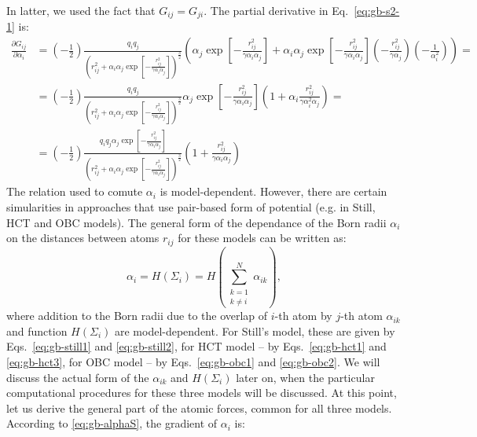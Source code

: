 \documentclass[11pt]{book}
\begin{document}
In latter, we used the fact that $G_{ij}=G_{ji}$. The partial derivative in Eq.~\ref{eq:gb-s2-1} is:
\begin{equation}\label{eq:gb-partGilalphai}
\begin{split}
\frac{\partial G_{ij}}{\partial \alpha_{i}}&=\left(-\frac{1}{2}\right)\frac{q_{i}q_{j}}{\left(r_{ij}^{2}+\alpha_{i}\alpha_{j}\exp{\left[-\frac{r_{ij}^{2}}{\gamma\alpha_{i}\alpha_{j}}\right]}\right)^{\frac{3}{2}}}\left(\alpha_{j}\exp{\left[-\frac{r_{ij}^{2}}{\gamma\alpha_{i}\alpha_{j}}\right]}+\alpha_{i}\alpha_{j}\exp{\left[-\frac{r_{ij}^{2}}{\gamma\alpha_{i}\alpha_{j}}\right]}\left(-\frac{r_{ij}^{2}}{\gamma\alpha_{j}}\right)\left(-\frac{1}{\alpha_{i}^{2}}\right)\right)=\\
&=\left(-\frac{1}{2}\right)\frac{q_{i}q_{j}}{\left(r_{ij}^{2}+\alpha_{i}\alpha_{j}\exp{\left[-\frac{r_{ij}^{2}}{\gamma\alpha_{i}\alpha_{j}}\right]}\right)^{\frac{3}{2}}}\alpha_{j}\exp{\left[-\frac{r_{ij}^{2}}{\gamma\alpha_{i}\alpha_{j}}\right]}\left(1+\alpha_{i}\frac{r_{ij}^{2}}{\gamma\alpha_{i}^{2}\alpha_{j}}\right)=\\
&=\left(-\frac{1}{2}\right)\frac{q_{i}q_{j}\alpha_{j}\exp{\left[-\frac{r_{ij}^{2}}{\gamma\alpha_{i}\alpha_{j}}\right]}}{\left(r_{ij}^{2}+\alpha_{i}\alpha_{j}\exp{\left[-\frac{r_{ij}^{2}}{\gamma\alpha_{i}\alpha_{j}}\right]}\right)^{\frac{3}{2}}}\left(1+\frac{r_{ij}^{2}}{\gamma\alpha_{i}\alpha_{j}}\right)
\end{split}
\end{equation}
The relation used to comute $\alpha_{i}$ is model-dependent. However, there are certain simularities in approaches that use pair-based form of potential (e.g. in Still, HCT and OBC models). The general form of the dependance of the Born radii $\alpha_{i}$ on the distances between atoms $r_{ij}$ for these models can be written as:
\begin{equation}\label{eq:gb-alphaS}
\alpha_{i}=H(\Sigma_{i})=H(\sum_{\substack{k=1\\k\ne i}}^{N}\alpha_{ik}),
\end{equation}
where addition to the Born radii due to the overlap of $i$-th atom by $j$-th atom $\alpha_{ik}$ and function $H(\Sigma_{i})$ are model-dependent. For Still's model, these are given by Eqs.~\ref{eq:gb-still1} and \ref{eq:gb-still2}, for HCT model -- by Eqs.~\ref{eq:gb-hct1} and \ref{eq:gb-hct3}, for OBC model -- by Eqs.~\ref{eq:gb-obc1} and \ref{eq:gb-obc2}. We will discuss the actual form of the $\alpha_{ik}$ and $H(\Sigma_{i})$ later on, when the particular computational procedures for these three models will be discussed. At this point, let us derive the general part of the atomic forces, common for all three models. According to \ref{eq:gb-alphaS}, the gradient of $\alpha_{i}$ is:
\end{document}
